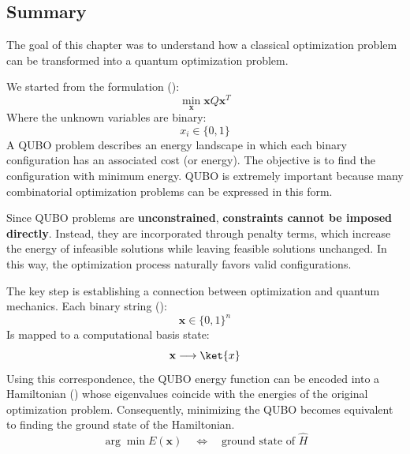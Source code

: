 \subsection{Summary}

The goal of this chapter was to understand how a classical optimization problem can be transformed into a quantum optimization problem.

\highspace
We started from the  formulation ():
\begin{equation*}
    \min_{\mathbf{x}} \mathbf{x}Q\mathbf{x}^{T}
\end{equation*}
Where the unknown variables are binary:
\begin{equation*}
    x_i \in \{0,1\}
\end{equation*}
A QUBO problem describes an energy landscape in which each binary configuration has an associated cost (or energy). The objective is to find the configuration with minimum energy. QUBO is extremely important because many combinatorial optimization problems can be expressed in this form.

\highspace
Since QUBO problems are \textbf{unconstrained}, \textbf{constraints cannot be imposed directly}. Instead, they are incorporated through penalty terms, which increase the energy of infeasible solutions while leaving feasible solutions unchanged. In this way, the optimization process naturally favors valid configurations.

\highspace
The key step is establishing a connection between optimization and quantum mechanics. Each binary string ():
\begin{equation*}
    \mathbf{x}\in\{0,1\}^n
\end{equation*}
Is mapped to a computational basis state:
\begin{equation*}
    \mathbf{x}
    \longrightarrow
    \ket{x}
\end{equation*}
Using this correspondence, the QUBO energy function can be encoded into a Hamiltonian () whose eigenvalues coincide with the energies of the original optimization problem. Consequently, minimizing the QUBO becomes equivalent to finding the ground state of the Hamiltonian.
\begin{equation*}
    \arg\min E(\mathbf{x})
    \quad \Longleftrightarrow \quad
    \text{ground state of } \hat{H}
\end{equation*}

